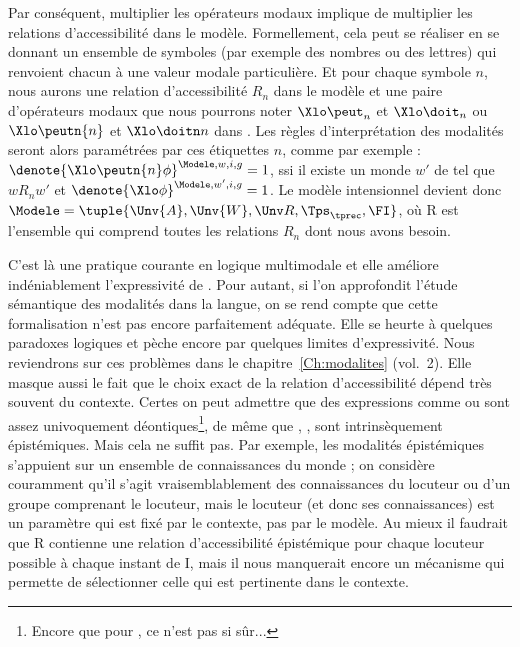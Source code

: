 Par conséquent, multiplier les opérateurs modaux implique de multiplier les relations d'accessibilité dans le modèle. 
Formellement, cela peut se réaliser en se donnant un ensemble de symboles (par exemple des nombres ou des lettres) qui renvoient chacun à une valeur modale particulière. Et pour chaque symbole $n$, nous aurons une relation d'accessibilité $R_n$ dans le modèle et une paire d'opérateurs modaux que nous pourrons noter 
$\Xlo\peut_n$ et $\Xlo\doit_n$ ou $\Xlo\peutn{n}$ et $\Xlo\doitn n$ dans \LO. 
Les règles d'interprétation des modalités seront alors paramétrées par ces étiquettes $n$, comme par exemple : 
\(\denote{\Xlo\peutn{n}\phi}^{\Modele,w,i,g}=1\), ssi il existe un monde
  $w'$ de {} tel que $w \mathrel{R_n} w'$ et \(\denote{\Xlo\phi}^{\Modele,w',i,g}=1\).  Le modèle intensionnel devient donc 
\(\Modele = \tuple{\Unv{A},\Unv{W},\Unv R,\Tps_{\tprec},\FI}\), où \Unv R est l'ensemble qui comprend toutes les relations $R_n$ dont nous avons besoin. 

C'est là une pratique courante en logique multimodale et elle améliore indéniablement l'expressivité de {\LO}. 
Pour autant, si l'on approfondit l'étude sémantique des modalités dans la langue, on se rend compte que cette formalisation n'est pas encore parfaitement adéquate. Elle se heurte à quelques paradoxes logiques et pèche encore par quelques limites d'expressivité. Nous reviendrons sur ces problèmes dans le chapitre~\ref{Ch:modalites} (vol.~2). Elle masque aussi le fait que le choix exact de la relation d'accessibilité dépend très souvent du contexte.  Certes on peut admettre que des expressions comme  ou  sont assez univoquement déontiques\footnote{Encore que pour , ce n'est pas si sûr...}, de même que , ,  sont intrinsèquement épistémiques. Mais cela ne suffit pas. 
Par exemple, les modalités épistémiques s'appuient sur un ensemble de connaissances du monde ; on considère couramment qu'il s'agit vraisemblablement des connaissances du locuteur ou d'un groupe comprenant le locuteur, mais le locuteur (et donc ses connaissances) est un paramètre qui est fixé par le contexte, pas par le modèle.  Au mieux il faudrait que \Unv R contienne une relation d'accessibilité épistémique pour chaque locuteur possible à chaque instant de \Unv I, mais il nous manquerait encore un mécanisme qui permette de sélectionner celle qui est pertinente dans le contexte.  

